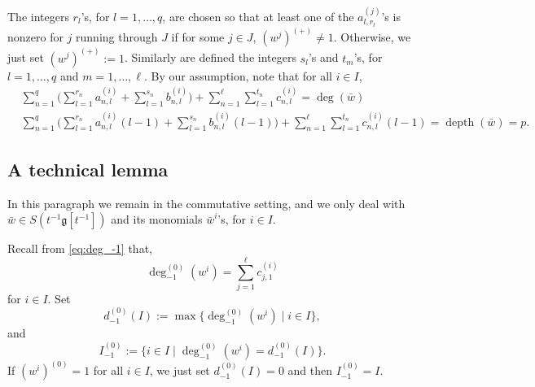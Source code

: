 \documentclass[JEP,XML,SOM,Unicode]{cedram}
\DeclareMathOperator{\dep}{depth}
\newcommand \g{\mathfrak g}
\theoremstyle{definition}
\begin{document}
The integers $r_l$'s, for $l=1,\dots,q$, are chosen so that at least one of the
$a_{l,r_l}^{(j)}$'s is nonzero for $j$ running through $J$
if for some $j \in J$, $(w^{j})^{(+)}\not= 1$.
Otherwise, we just set $(w^{j})^{(+)} := 1$.
Similarly are defined the integers $s_l$'s and $t_m$'s,
for $l =1,\dots,q$ and $m=1,\dots,\ell$. By our assumption, note that for all $i \in I$,
\begin{align*}
& \sum_{n=1}^q \biggl(\sum_{l=1}^{r_n}
a_{n,l}^{(i)} + \sum_{l=1}^{s_n} b_{n,l}^{(i)} \biggr)
+ \sum_{n=1}^\ell \sum_{l=1}^{t_n} c_{n,l}^{(i)} = \deg(\bar w)&\\
& \sum_{n=1}^q \biggl(\sum_{l=1}^{r_n}
a_{n,l}^{(i)} (l-1) + \sum_{l=1}^{s_n} b_{n,l}^{(i)} (l-1) \biggr)
+ \sum_{n=1}^\ell \sum_{l=1}^{t_n} c_{n,l}^{(i)} (l-1)
= \dep(\bar w) = p.&
\end{align*}

\subsection{A technical lemma}
\label{sub:technical}
In this paragraph we remain in the commutative setting, and we only
deal with $\bar w \in S(t^{-1}\g[t^{-1}])$ and its monomials $\bar w^{i}$'s,
for $ i \in I$.

Recall from \eqref{eq:deg_-1} that,
\[
\deg_{-1}^{(0)}(w^i)= \sum_{j=1}^\ell c_{j,1}^{(i)}
\]
for $i \in I$.
Set
\[
d_{-1}^{(0)}(I) := \max\{\deg_{-1}^{(0)}(w^i) \mid i \in I\},
\]
and
\[
I_{-1}^{(0)} := \{ i\in I \mid \deg_{-1}^{(0)}(w^i)= d_{-1}^{(0)}(I)\}.
\]
If $(w^i)^{(0)}=1$ for all $i \in I$, we just set $d_{-1}^{(0)}(I)=0$
and then $I_{-1}^{(0)}=I$.
\end{document}
